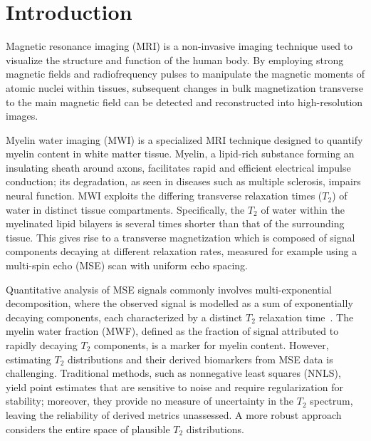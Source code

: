 \section{Introduction}

Magnetic resonance imaging (\gls*{MRI}) is a non-invasive imaging technique used to visualize the structure and function of the human body.
By employing strong magnetic fields and radiofrequency pulses to manipulate the magnetic moments of atomic nuclei within tissues, subsequent changes in bulk magnetization transverse to the main magnetic field can be detected and reconstructed into high-resolution images.

Myelin water imaging (\gls*{MWI}) is a specialized \gls*{MRI} technique designed to quantify myelin content in white matter tissue.
Myelin, a lipid-rich substance forming an insulating sheath around axons, facilitates rapid and efficient electrical impulse conduction;
its degradation, as seen in diseases such as multiple sclerosis, impairs neural function.
\gls*{MWI} exploits the differing transverse relaxation times ($T_2$) of water in distinct tissue compartments.
Specifically, the $T_2$ of water within the myelinated lipid bilayers is several times shorter than that of the surrounding tissue.
This gives rise to a transverse magnetization which is composed of signal components decaying at different relaxation rates, measured for example using a multi-spin echo (\gls*{MSE}) scan with uniform echo spacing.

Quantitative analysis of \gls*{MSE} signals commonly involves multi-exponential decomposition, where the observed signal is modelled as a sum of exponentially decaying components, each characterized by a distinct $T_2$ relaxation time~\citep{doucette_decaes_2020}.
The myelin water fraction (\gls*{MWF}), defined as the fraction of signal attributed to rapidly decaying $T_2$ components, is a marker for myelin content.
However, estimating $T_2$ distributions and their derived biomarkers from \gls*{MSE} data is challenging.
Traditional methods, such as nonnegative least squares (\gls*{NNLS}), yield point estimates that are sensitive to noise and require regularization for stability;
moreover, they provide no measure of uncertainty in the $T_2$ spectrum, leaving the reliability of derived metrics unassessed.
A more robust approach considers the entire space of plausible $T_2$ distributions.

